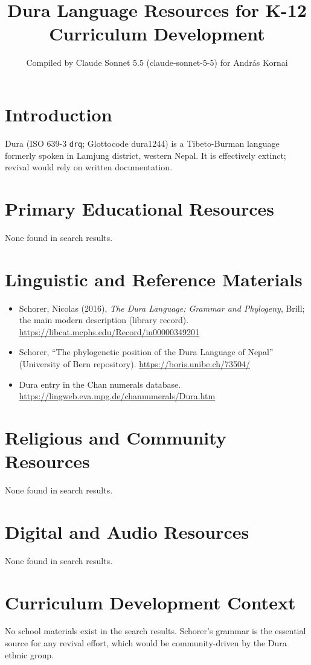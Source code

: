 \documentclass[12pt]{article}
\title{Dura Language Resources for K-12 Curriculum Development}
\author{Compiled by Claude Sonnet 5.5 (claude-sonnet-5-5) for Andr\'as Kornai}
\date{}
\begin{document}
\maketitle
\section{Introduction}
Dura (ISO 639-3 \texttt{drq}; Glottocode dura1244) is a Tibeto-Burman language formerly spoken in Lamjung district, western Nepal. It is effectively extinct; revival would rely on written documentation.
\section{Primary Educational Resources}
None found in search results.
\section{Linguistic and Reference Materials}
\begin{itemize}
\item Schorer, Nicolas (2016), \emph{The Dura Language: Grammar and Phylogeny}, Brill; the main modern description (library record). \url{https://libcat.mcphs.edu/Record/in00000349201}
\item Schorer, ``The phylogenetic position of the Dura Language of Nepal'' (University of Bern repository). \url{https://boris.unibe.ch/73504/}
\item Dura entry in the Chan numerals database. \url{https://lingweb.eva.mpg.de/channumerals/Dura.htm}
\end{itemize}
\section{Religious and Community Resources}
None found in search results.
\section{Digital and Audio Resources}
None found in search results.
\section{Curriculum Development Context}
No school materials exist in the search results. Schorer's grammar is the essential source for any revival effort, which would be community-driven by the Dura ethnic group.
\end{document}
